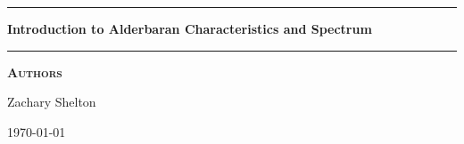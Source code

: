 
\begin{titlepage}
\begin{center}
\vspace{2cm}
\vspace{2cm}

\vspace{2cm}

\hrule
\vspace{.5cm}
{ \huge \bfseries Introduction to Alderbaran Characteristics and Spectrum} %
\vspace{.5cm}

\hrule
\vspace{1.5cm}

\textsc{\textbf{Authors}}\\
\vspace{.5cm}
\centering

Zachary Shelton 
\vspace{4cm}

\centering \today %
\end{center}
\end{titlepage}